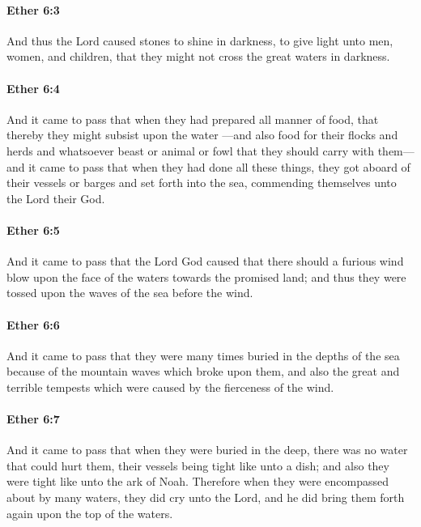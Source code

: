 		\paragraph{Ether 6:3} %
			\label{ETHER-6-3}

			And thus the Lord caused stones to shine in darkness,
			to give light unto men, women, and children,
			that they might not cross the great waters in darkness.

		\paragraph{Ether 6:4} %
			\label{ETHER-6-4}

			And it came to pass that when they had prepared all manner of food,
			that thereby they might subsist upon the water
			---and also food for their flocks and herds
			and whatsoever beast or animal or fowl that they should carry with them---
			and it came to pass that when they had done all these things,
			they got aboard of their vessels or barges and set forth into the sea,
			commending themselves unto the Lord their God.

		\paragraph{Ether 6:5} %
			\label{ETHER-6-5}

			And it came to pass that the Lord God caused
			that there should a furious wind blow
			upon the face of the waters towards the promised land;
			and thus they were tossed upon the waves of the sea before the wind.

		\paragraph{Ether 6:6} %
			\label{ETHER-6-6}

			And it came to pass that they were many times buried in the depths of the sea
			because of the mountain waves which broke upon them,
			and also the great and terrible tempests
			which were caused by the fierceness of the wind.

		\paragraph{Ether 6:7} %
			\label{ETHER-6-7}

			And it came to pass that when they were buried in the deep,
			there was no water that could hurt them,
			their vessels being tight like unto a dish;
			and also they were tight like unto the ark of Noah.
			Therefore when they were encompassed about by many waters,
			they did cry unto the Lord,
			and he did bring them forth again upon the top of the waters.

